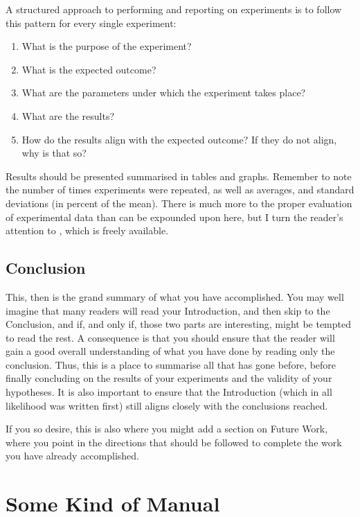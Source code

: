 \documentclass[ twoside,openright,titlepage,numbers=noenddot,headinclude,%
                footinclude=true,cleardoublepage=empty,abstractoff, %
                BCOR=5mm,paper=a4,fontsize=11pt,%
                ngerman,american,%
                ]{scrreprt}
\begin{document}
A structured approach to performing and reporting on experiments is
to follow this pattern for every single experiment:

\begin{enumerate}
\item What is the purpose of the experiment?
\item What is the expected outcome?
\item What are the parameters under which the experiment takes place?
\item What are the results?
\item How do the results align with the expected outcome? If they do
  not align, why is that so?
\end{enumerate}

Results should be presented summarised in tables and graphs.  Remember
to note the number of times experiments were repeated, as well as
averages, and standard deviations (in percent of the mean).  There is
much more to the proper evaluation of experimental data than can be
expounded upon here, but I turn the reader's attention to
\citep{Downey2011:TSPASFP2011}, which is freely available.


\chapter{Conclusion}
\label{cha:conclusion}

This, then is the grand summary of what you have accomplished.  You
may well imagine that many readers will read your Introduction, and
then skip to the Conclusion, and if, and only if, those two parts are
interesting, might be tempted to read the rest. A consequence is that
you should ensure that the reader will gain a good overall
understanding of what you have done by reading only the conclusion.
Thus, this is a place to summarise all that has gone before, before
finally concluding on the results of your experiments and the validity
of your hypotheses. It is also important to ensure that the
Introduction (which in all likelihood was written first) still aligns
closely with the conclusions reached.

If you so desire, this is also where you might add a section on Future
Work, where you point in the directions that should be followed to
complete the work you have already accomplished.



\part{Some Kind of Manual}

\cleardoublepage
\end{document}
